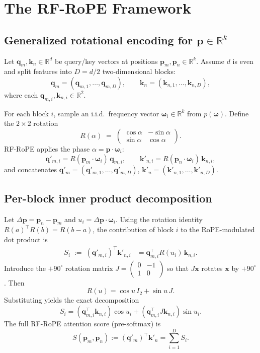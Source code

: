 \documentclass{article}
\theoremstyle{plain}
\theoremstyle{remark}
\begin{document}
\section{The RF-RoPE Framework}

\subsection{Generalized rotational encoding for $\mathbf{p}\in\mathbb{R}^k$}
Let $\mathbf{q}_m,\mathbf{k}_n\in\mathbb{R}^d$ be query/key vectors at positions $\mathbf{p}_m,\mathbf{p}_n\in\mathbb{R}^k$. Assume $d$ is even and split features into $D=d/2$ two-dimensional blocks:
\[
\mathbf{q}_m = (\mathbf{q}_{m,1},\ldots,\mathbf{q}_{m,D}),\qquad
\mathbf{k}_n = (\mathbf{k}_{n,1},\ldots,\mathbf{k}_{n,D}),
\]
where each $\mathbf{q}_{m,i},\mathbf{k}_{n,i}\in\mathbb{R}^2$.

For each block $i$, sample an i.i.d.\ frequency vector $\boldsymbol{\omega}_i\in\mathbb{R}^k$ from $p(\boldsymbol{\omega})$. Define the $2\times 2$ rotation
\[
R(\alpha) \;=\;
\begin{pmatrix}
\cos\alpha & -\sin\alpha\\
\sin\alpha & \cos\alpha
\end{pmatrix}.
\]
RF-RoPE applies the phase $\alpha=\mathbf{p}\cdot\boldsymbol{\omega}_i$:
\[
\mathbf{q}'_{m,i} = R(\mathbf{p}_m\cdot\boldsymbol{\omega}_i)\,\mathbf{q}_{m,i},
\qquad
\mathbf{k}'_{n,i} = R(\mathbf{p}_n\cdot\boldsymbol{\omega}_i)\,\mathbf{k}_{n,i},
\]
and concatenates $\mathbf{q}'_m=(\mathbf{q}'_{m,1},\dots,\mathbf{q}'_{m,D})$, $\mathbf{k}'_n=(\mathbf{k}'_{n,1},\dots,\mathbf{k}'_{n,D})$.

\subsection{Per-block inner product decomposition}
Let $\Delta\mathbf{p}=\mathbf{p}_n-\mathbf{p}_m$ and $u_i=\Delta\mathbf{p}\cdot\boldsymbol{\omega}_i$. Using the rotation identity
$R(a)^\top R(b)=R(b-a)$, the contribution of block $i$ to the RoPE-modulated dot product is
\begin{align*}
S_i
\;:=\;
(\mathbf{q}'_{m,i})^\top \mathbf{k}'_{n,i}
&=
\mathbf{q}_{m,i}^\top R(u_i)\,\mathbf{k}_{n,i}.
\end{align*}
Introduce the $+90^\circ$ rotation matrix
$
J=
\begin{pmatrix}
0 & -1\\
1 & 0
\end{pmatrix}
$
so that $J\mathbf{x}$ rotates $\mathbf{x}$ by $+90^\circ$. Then
\[
R(u) = \cos u \,I_2 + \sin u \,J.
\]
Substituting yields the exact decomposition
\begin{equation}
\label{eq:Si-decomp}
S_i
=
(\mathbf{q}_{m,i}^\top \mathbf{k}_{n,i})\cos u_i
+
(\mathbf{q}_{m,i}^\top J\mathbf{k}_{n,i})\sin u_i.
\end{equation}
The full RF-RoPE attention score (pre-softmax) is
\[
S(\mathbf{p}_m,\mathbf{p}_n)
:= (\mathbf{q}'_m)^\top \mathbf{k}'_n
= \sum_{i=1}^{D} S_i.
\]
\end{document}
